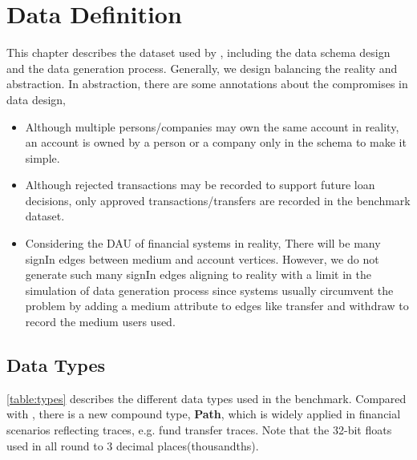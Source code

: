 \chapter{Data Definition}
\label{sec:data-definition}

This chapter describes the dataset used by \ldbcfinbench, including the data schema design
and the data generation process. Generally, we design \ldbcfinbench balancing the reality
and abstraction. In abstraction, there are some annotations about the compromises in data
design,
\begin{itemize}
    \item Although multiple persons/companies may own the same account in reality, an account
          is owned by a person or a company only in the schema to make it simple.
    \item Although rejected transactions may be recorded to support future loan decisions,
          only approved transactions/transfers are recorded in the benchmark dataset.
    \item Considering the DAU of financial systems in reality, There will be many signIn edges
          between medium and account vertices. However, we do not generate such many signIn edges aligning
          to reality with a limit in the simulation of data generation process since systems usually
          circumvent the problem by adding a medium attribute to edges like transfer and withdraw to
          record the medium users used.
\end{itemize}

\section{Data Types}

\autoref{table:types} describes the different data types used in the benchmark. Compared
with \ldbcsnb, there is a new compound type, \textbf{Path}, which is widely applied in
financial scenarios reflecting traces, e.g. fund transfer traces. Note that the 32-bit
floats used in \ldbcfinbench all round to 3 decimal places(thousandths).


